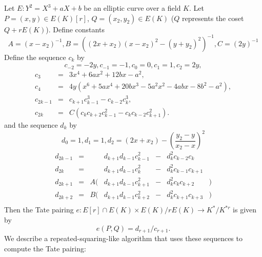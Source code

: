Let $E:Y^2 = X^3 + aX + b$ be an elliptic curve over a field $K$.
Let $P=(x, y) \in E(K)[r]$, $Q=(x_2, y_2) \in E(K)$ ($Q$ represents the
coset $Q + rE(K)$).
Define constants
\[
    A = (x - x_2)^{-1},
    B = \left((2x + x_2)(x - x_2)^2 - (y + y_2)^2\right)^{-1},
    C = (2 y)^{-1}
\]
Define the sequence $c_k$ by
\[
    c_{-2} = -2y,
    c_{-1} = -1,
    c_0 = 0,
    c_1 = 1,
    c_2 = 2 y,
\]
\[
\begin{array}{lcl}
    c_3 &=& 3 x^4 + 6ax^2 + 12bx - a^2, \\
    c_4 &=& 4y(x^6+5ax^4+20bx^3-5a^2x^2-4abx-8b^2 -a^2), \\
    c_{2k-1} &=& c_{k+1} c_{k-1}^3 - c_{k-2} c_k^3, \\
    c_{2k} &=& C(c_k c_{k+2} c_{k-1}^2 - c_k c_{k-2} c_{k+1}^2).
\end{array}
\]
and the sequence $d_k$ by
\[
    d_0 = 1,
    d_1 = 1,
    d_2 = (2x+x_2) - \left( \frac{y_2-y}{x_2-x} \right) ^2
\]
\[
\begin{array}{lcrlcll}
    d_{2k-1} &=& & d_{k+1} d_{k-1} c_{k-1}^2 &-& d_k^2 c_{k-2} c_{k}& \\ 
    d_{2k} &=& & d_{k+1} d_{k-1} c_{k}^2 &-& d_k^2 c_{k-1} c_{k+1}& \\
    d_{2k+1} &=& A(& d_{k+1} d_{k-1} c_{k+1}^2 &-& d_k^2 c_{k} c_{k+2}&) \\
    d_{2k+2} &=& B(& d_{k+1} d_{k-1} c_{k+2}^2 &-& d_k^2 c_{k+1} c_{k+3}&) \\
\end{array}
\]
Then the Tate pairing
$
e : E[r] \cap E(K) \times
E(K) / r E(K) \rightarrow
K^* / K^{*r}
$
is given by
\[
e(P,Q) = d_{r+1}/c_{r+1}.
\]
We describe a repeated-squaring-like algorithm that uses these sequences
to compute the Tate pairing:
